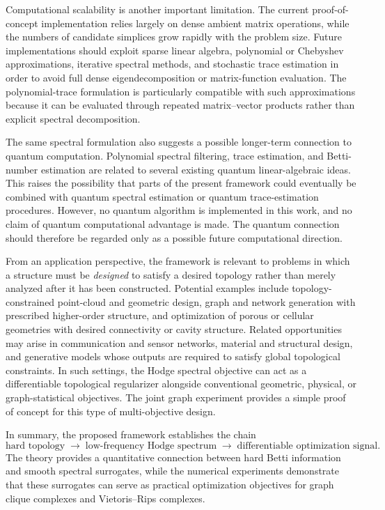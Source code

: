 \documentclass[pdflatex,sn-mathphys-num]{sn-jnl}%
\theoremstyle{thmstyleone}%
\theoremstyle{thmstyletwo}%
\theoremstyle{thmstylethree}%
\begin{document}
Computational scalability is another important limitation.
The current proof-of-concept implementation relies largely on dense ambient matrix operations, while the numbers of candidate simplices grow rapidly with the problem size.
Future implementations should exploit sparse linear algebra, polynomial or Chebyshev approximations, iterative spectral methods, and stochastic trace estimation in order to avoid full dense eigendecomposition or matrix-function evaluation.
The polynomial-trace formulation is particularly compatible with such approximations because it can be evaluated through repeated matrix--vector products rather than explicit spectral decomposition.

The same spectral formulation also suggests a possible longer-term connection to quantum computation.
Polynomial spectral filtering, trace estimation, and Betti-number estimation are related to several existing quantum linear-algebraic ideas.
This raises the possibility that parts of the present framework could eventually be combined with quantum spectral estimation or quantum trace-estimation procedures.
However, no quantum algorithm is implemented in this work, and no claim of quantum computational advantage is made.
The quantum connection should therefore be regarded only as a possible future computational direction.

From an application perspective, the framework is relevant to problems in which a structure must be \emph{designed} to satisfy a desired topology rather than merely analyzed after it has been constructed.
Potential examples include topology-constrained point-cloud and geometric design, graph and network generation with prescribed higher-order structure, and optimization of porous or cellular geometries with desired connectivity or cavity structure.
Related opportunities may arise in communication and sensor networks, material and structural design, and generative models whose outputs are required to satisfy global topological constraints.
In such settings, the Hodge spectral objective can act as a differentiable topological regularizer alongside conventional geometric, physical, or graph-statistical objectives.
The joint graph experiment provides a simple proof of concept for this type of multi-objective design.

In summary, the proposed framework establishes the chain
\[
\boxed{
\text{hard topology}
\;\longrightarrow\;
\text{low-frequency Hodge spectrum}
\;\longrightarrow\;
\text{differentiable optimization signal}.
}
\]
The theory provides a quantitative connection between hard Betti information and smooth spectral surrogates, while the numerical experiments demonstrate that these surrogates can serve as practical optimization objectives for graph clique complexes and Vietoris--Rips complexes.
\end{document}
